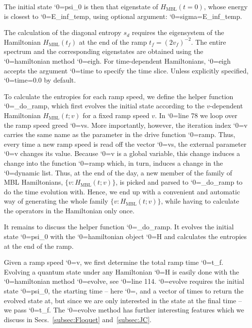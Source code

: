 \documentclass{SciPost}
\newcommand\0{\scalebox{-1}[1]{0}}
\let\svttfamily\ttfamily
\renewcommand\ttfamily{\svttfamily\catcode`0=\active }
\renewcommand\texttt{\bgroup\ttfamily\texttthelp}
\def\texttthelp#1{#1\egroup}
\begin{document}

%
The initial state \texttt{psi\_0} is then that eigenstate of $H_\mathrm{MBL}(t=0)$, whose energy is closest to \texttt{E\_inf\_temp}, using optional argument: \texttt{sigma=E\_inf\_temp}.

%
The calculation of the diagonal entropy $s_d$ requires the eigensystem of the Hamiltonian $H_\mathrm{MBL}(t_f)$ at the end of the ramp $t_f=(2v_f)^{-2}$. The entire spectrum and the corresponding eigenstates are obtained using the \texttt{hamiltonian} method \texttt{eigh}. For time-dependent Hamiltonians, \texttt{eigh} accepts the argument \texttt{time} to specify the time slice. Unless explicitly specified, \texttt{time=0.0} by default.

%
To calculate the entropies for each ramp speed, we define the helper function \texttt{\_do\_ramp}, which first evolves the initial state according to the $v$-dependent Hamiltonian $H_\mathrm{MBL}(t;v)$ for a fixed ramp speed $v$. In \texttt{line 78} we loop over the ramp speed greed \texttt{vs}. More importantly, however, the iteration index \texttt{v} carries the same name as the parameter in the drive function \texttt{ramp}. Thus, every time a new ramp speed is read off the vector \texttt{vs}, the external parameter \texttt{v} changes its value. Because \texttt{v} is a global variable, this change induces a change into the function \texttt{ramp} which, in turn, induces a change in the \texttt{dynamic} list. Thus, at the end of the day, a new member of the family of MBL Hamiltonians, $\{v: H_\mathrm{MBL}(t;v)\}$, is picked and parsed to \texttt{\_do\_ramp} to do the time evolution with. Hence, we end up with a convenient and automatic way of generating the whole family $\{v: H_\mathrm{MBL}(t;v)\}$, while having to calculate the operators in the Hamiltonian only once. 

%
It remains to discuss the helper function \texttt{\_do\_ramp}. It evolves the initial state \texttt{psi\_0} with the \texttt{hamiltonian} object \texttt{H} and calculates the entropies at the end of the ramp. 

% 
Given a ramp speed \texttt{v}, we first determine the total ramp time \texttt{t\_f}. Evolving a quantum state under any Hamiltonian \texttt{H} is easily done with the \texttt{hamiltonian} method \texttt{evolve}, see \texttt{line 114}. \texttt{evolve} requires the initial state \texttt{psi\_0}, the starting time -- here \texttt{0.0}, and a vector of times to return the evolved state at, but since we are only interested in the state at the final time -- we pass \texttt{t\_f}. The \texttt{evolve} method has further interesting features which we discuss in Secs.~\ref{subsec:Floquet} and~\ref{subsec:JC}.
\end{document}
